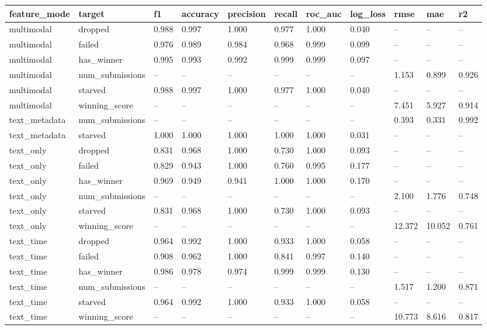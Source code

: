 \begin{tabular}{lllllllllll}
\toprule
feature\_mode & target & f1 & accuracy & precision & recall & roc\_auc & log\_loss & rmse & mae & r2 \\
\midrule
multimodal & dropped & 0.988 & 0.997 & 1.000 & 0.977 & 1.000 & 0.040 & -- & -- & -- \\
multimodal & failed & 0.976 & 0.989 & 0.984 & 0.968 & 0.999 & 0.099 & -- & -- & -- \\
multimodal & has\_winner & 0.995 & 0.993 & 0.992 & 0.999 & 0.999 & 0.097 & -- & -- & -- \\
multimodal & num\_submissions & -- & -- & -- & -- & -- & -- & 1.153 & 0.899 & 0.926 \\
multimodal & starved & 0.988 & 0.997 & 1.000 & 0.977 & 1.000 & 0.040 & -- & -- & -- \\
multimodal & winning\_score & -- & -- & -- & -- & -- & -- & 7.451 & 5.927 & 0.914 \\
text\_metadata & num\_submissions & -- & -- & -- & -- & -- & -- & 0.393 & 0.331 & 0.992 \\
text\_metadata & starved & 1.000 & 1.000 & 1.000 & 1.000 & 1.000 & 0.031 & -- & -- & -- \\
text\_only & dropped & 0.831 & 0.968 & 1.000 & 0.730 & 1.000 & 0.093 & -- & -- & -- \\
text\_only & failed & 0.829 & 0.943 & 1.000 & 0.760 & 0.995 & 0.177 & -- & -- & -- \\
text\_only & has\_winner & 0.969 & 0.949 & 0.941 & 1.000 & 1.000 & 0.170 & -- & -- & -- \\
text\_only & num\_submissions & -- & -- & -- & -- & -- & -- & 2.100 & 1.776 & 0.748 \\
text\_only & starved & 0.831 & 0.968 & 1.000 & 0.730 & 1.000 & 0.093 & -- & -- & -- \\
text\_only & winning\_score & -- & -- & -- & -- & -- & -- & 12.372 & 10.052 & 0.761 \\
text\_time & dropped & 0.964 & 0.992 & 1.000 & 0.933 & 1.000 & 0.058 & -- & -- & -- \\
text\_time & failed & 0.908 & 0.962 & 1.000 & 0.841 & 0.997 & 0.140 & -- & -- & -- \\
text\_time & has\_winner & 0.986 & 0.978 & 0.974 & 0.999 & 0.999 & 0.130 & -- & -- & -- \\
text\_time & num\_submissions & -- & -- & -- & -- & -- & -- & 1.517 & 1.200 & 0.871 \\
text\_time & starved & 0.964 & 0.992 & 1.000 & 0.933 & 1.000 & 0.058 & -- & -- & -- \\
text\_time & winning\_score & -- & -- & -- & -- & -- & -- & 10.773 & 8.616 & 0.817 \\
\bottomrule
\end{tabular}
